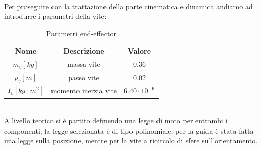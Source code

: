 \\Per proseguire con la trattazione della parte cinematica e dinamica andiamo ad introdurre i parametri della vite:
\begin{table}[h!]
\centering
\begin{tabular}{|c |c |c|} 
 \hline
 Nome & Descrizione  & Valore \\ [0.5ex] 
 \hline\hline
 $m_v [kg]$ & massa vite  & 0.36 \\ 
 $p_v [m]$ & passo vite & 0.02 \\
 $I_v [kg\cdot m^2]$ & momento inerzia vite  & $6.40\cdot 10^{-6}$ \\
 \hline
\end{tabular}
\caption{Parametri end-effector}
\label{table:2}
\end{table}
\\A livello teorico si è partito definendo una legge di moto per entrambi i componenti; la legge selezionata è di tipo polinomiale, per la guida è stata fatta una legge sulla posizione, mentre per la vite a ricircolo di sfere sull'orientamento.
